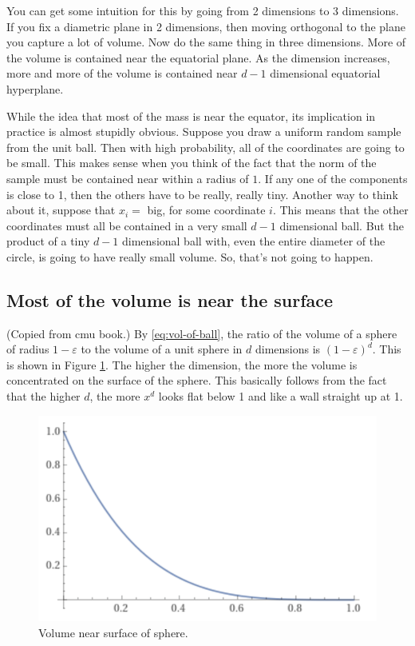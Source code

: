 \documentclass{book}
\newcommand{\eps}{\varepsilon}
\begin{document}
You can get some intuition for this by going from 2 dimensions to 3 dimensions. If you fix a diametric plane in 2 dimensions, then moving orthogonal to the plane you capture a lot of volume. Now do the same thing in three dimensions. More of the volume is contained near the equatorial plane. As the dimension increases, more and more of the volume is contained near $d-1$ dimensional equatorial hyperplane. 

While the idea that most of the mass is near the equator, its implication in practice is almost stupidly obvious. Suppose you draw a uniform random sample from the unit ball. Then with high probability, all of the coordinates are going to be small. This makes sense when you think of the fact that the norm of the sample must be contained near within a radius of $1$. If any one of the components is close to 1, then the others have to be really, really tiny. Another way to think about it, suppose that $x_i = $ big, for some coordinate $i$. This means that the other coordinates must all be contained in a very small $d-1$ dimensional ball. But the product of a tiny $d-1$ dimensional ball with, even the entire diameter of the circle, is going to have really small volume. So, that's not going to happen. 

\subsection{Most of the volume is near the surface}
(Copied from cmu book.) By \eqref{eq:vol-of-ball}, the ratio of the volume of a sphere of radius $1-\eps$ to the volume of a unit sphere in $d$ dimensions is $
(1-\eps)^d.$
This is shown in Figure \ref{fig:vol-near-surf}. 
The higher the dimension, the more the volume is concentrated on the surface of the sphere. This basically follows from the fact that the higher $d$, the more $x^d$ looks flat below 1 and like a wall straight up at 1. 
\begin{figure} \label{fig:vol-near-surf}
\centering
\includegraphics[scale = .5]{high_dimensional_space/vol-near-surf.png}
\caption{Volume near surface of sphere.}
\end{figure}
\end{document}
